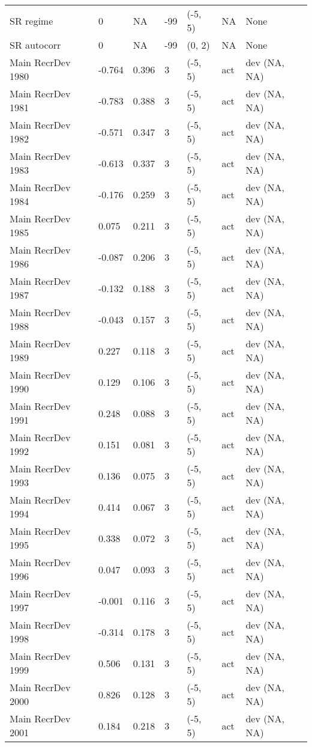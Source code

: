 \documentclass[11pt,
  letterpaper,
]{article}
\begin{document}
\begin{landscape}
\begin{longtable}[t]{>{\raggedright\arraybackslash}p{7.5cm}lllll>{\raggedright\arraybackslash}p{3.5cm}}
SR regime & 0 & NA & -99 & (-5, 5) & NA & None\\
SR autocorr & 0 & NA & -99 & (0, 2) & NA & None\\
Main RecrDev 1980 & -0.764 & 0.396 & 3 & (-5, 5) & act & dev (NA, NA)\\
Main RecrDev 1981 & -0.783 & 0.388 & 3 & (-5, 5) & act & dev (NA, NA)\\
Main RecrDev 1982 & -0.571 & 0.347 & 3 & (-5, 5) & act & dev (NA, NA)\\
Main RecrDev 1983 & -0.613 & 0.337 & 3 & (-5, 5) & act & dev (NA, NA)\\
Main RecrDev 1984 & -0.176 & 0.259 & 3 & (-5, 5) & act & dev (NA, NA)\\
Main RecrDev 1985 & 0.075 & 0.211 & 3 & (-5, 5) & act & dev (NA, NA)\\
Main RecrDev 1986 & -0.087 & 0.206 & 3 & (-5, 5) & act & dev (NA, NA)\\
Main RecrDev 1987 & -0.132 & 0.188 & 3 & (-5, 5) & act & dev (NA, NA)\\
Main RecrDev 1988 & -0.043 & 0.157 & 3 & (-5, 5) & act & dev (NA, NA)\\
Main RecrDev 1989 & 0.227 & 0.118 & 3 & (-5, 5) & act & dev (NA, NA)\\
Main RecrDev 1990 & 0.129 & 0.106 & 3 & (-5, 5) & act & dev (NA, NA)\\
Main RecrDev 1991 & 0.248 & 0.088 & 3 & (-5, 5) & act & dev (NA, NA)\\
Main RecrDev 1992 & 0.151 & 0.081 & 3 & (-5, 5) & act & dev (NA, NA)\\
Main RecrDev 1993 & 0.136 & 0.075 & 3 & (-5, 5) & act & dev (NA, NA)\\
Main RecrDev 1994 & 0.414 & 0.067 & 3 & (-5, 5) & act & dev (NA, NA)\\
Main RecrDev 1995 & 0.338 & 0.072 & 3 & (-5, 5) & act & dev (NA, NA)\\
Main RecrDev 1996 & 0.047 & 0.093 & 3 & (-5, 5) & act & dev (NA, NA)\\
Main RecrDev 1997 & -0.001 & 0.116 & 3 & (-5, 5) & act & dev (NA, NA)\\
Main RecrDev 1998 & -0.314 & 0.178 & 3 & (-5, 5) & act & dev (NA, NA)\\
Main RecrDev 1999 & 0.506 & 0.131 & 3 & (-5, 5) & act & dev (NA, NA)\\
Main RecrDev 2000 & 0.826 & 0.128 & 3 & (-5, 5) & act & dev (NA, NA)\\
Main RecrDev 2001 & 0.184 & 0.218 & 3 & (-5, 5) & act & dev (NA, NA)\\

\end{longtable}
\end{landscape}
\end{document}
